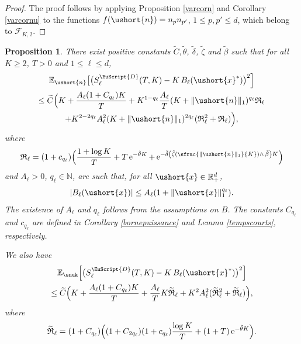 \documentclass[JEP,XML,SOM,Unicode]{cedram}
\newcommand{\Psfrac}[2]{(\sfrac{#1}{#2})}
\newcommand{\scaleto}[2]{#1}
\numberwithin{equation}{section}
\theoremstyle{plain}
\newtheorem{proposition}[theorem]{Proposition}
\theoremstyle{definition}
\newcommand{\E}{{\mathbb{E}}}
\newcommand{\integers}{\mathbb{N}}
\newcommand{\rpd}{\mathbb{R}_+^d}
\newcommand{\sK}{K}
\newcommand{\vecn}{\ushort{n}}
\newcommand{\vecxf}{\ushort{x}^*}
\newcommand{\vecx}{\ushort{x}}
\newcommand{\e}{\operatorname{e}}
\newcommand{\norm}[1]{\|#1\|_{1}}\let\snorm\norm
\begin{document}
\begin{proof}
The proof follows by applying Proposition \ref{varcorn} and Corollary \ref{varcornu} to the functions
$f(\vecn)=n_p n_{p'}$, $1\leq p,p' \leq d$, which belong to $\mathscr{F}\!_{\sK,2}$.
\end{proof}

\begin{proposition}
There exist positive constants $\widetilde{C}, \tilde{\theta}$, $\tilde{\delta}$, $\tilde{\zeta}$ and $\tilde{\beta}$ such that for all $K\geq 2$, $T>0$ and $1\leq \ell\leq d$,
\begin{multline*}
\E_{\vecn}\bigl[\bigl(S^{{ \EuScript{D}}}_{\ell}(T,K)-K\,B_{\ell}(\vecxf)\bigr)^2\Bigr]\\
\le\widetilde{C} \Bigl(
K + \frac{A_\ell (1+C_{q_\ell}) K}{T} + K^{1-q_\ell} \frac{A_\ell}{T} (K+\norm{\vecn})^{q_\ell} \mathfrak{R}_\ell \\
+ K^{{2}-{2}q_\ell} A_\ell^2
(K+\norm{\vecn})^{2q_\ell}(\mathfrak{R}_\ell^2+\mathfrak{R}_\ell)
\Bigr),
\end{multline*}
where
\[
\mathfrak{R}_\ell=
(1+c_{q_\ell}) \Bigl(\frac{1+\log K}{T} + T \e^{-\tilde{\theta} K}
+ \e^{-\tilde{\delta}\left(\tilde{\zeta}\Psfrac{\|\vecn\|_{1}}{K}\wedge\, \tilde{\beta}\right)K} \Bigr)
\]
and $A_\ell>0$, $q_\ell\in\integers$, are such that, for all $\vecx \in \rpd$,
\[
|B_\ell(\vecx)|\leq A_\ell (1+ \norm{\vecx}^{\scaleto{q_\ell}{3.6pt}}).
\]
The existence of $A_\ell$ and $q_\ell$ follows from the assumptions on $B$. The constants $C_{q_\ell}$ and $c_{q_\ell}$ are
defined in Corollary \ref{bornepuissance} and Lemma \ref{tempscourts}, respectively.

We also have
\begin{multline*}
\E_{\snuk} \Bigl[\bigl(S^{{ \EuScript{D}}}_{\ell}(T,K)-K\,B_{\ell}(\vecxf)\bigr)^2 \Bigr]\\
\le
\widetilde{C} \Bigl(K + \frac{A_\ell (1+C_{q_\ell}) K}{T} + \frac{A_\ell}{T} K \widetilde{\mathfrak{R}}_\ell +
K^2 A_\ell^2 (\widetilde{\mathfrak{R}}_\ell^2+\widetilde{\mathfrak{R}}_\ell) \Bigr),
\end{multline*}
where
\[
\widetilde{\mathfrak{R}}_\ell=(1+C_{q_\ell}) \Bigl((1+C_{2q_\ell})(1+c_{q_\ell})\frac{\log K}{T} +(1+T) \e^{-\tilde{\theta} K} \Bigr).
\]
\end{proposition}
\end{document}
